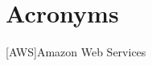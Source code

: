 \documentclass[12pt,a4paper]{book}
\begin{document}
	



\newpage
\thispagestyle{empty}
\mbox{}


\setcounter{secnumdepth}{4}
\setcounter{tocdepth}{3} 







\tableofcontents




%




\appendix





\backmatter

\listoftables
\listoffigures

\chapter{Acronyms}
\begin{acronym}[AWS]
 [AWS]{Amazon Web Services}
\end{acronym}
\printglossaries
\label{cha:bibliography}
\nocite{*}
\printbibliography
\end{document}

